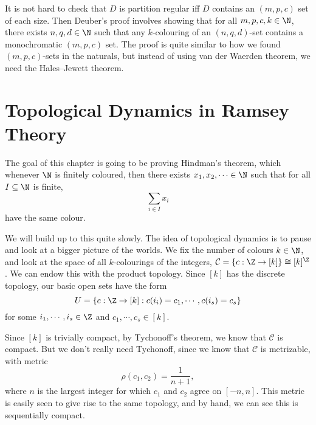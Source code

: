 \documentclass[a4paper]{article}
\begin{document}
It is not hard to check that $D$ is partition regular iff $D$ contains an $(m, p, c)$ set of each size. Then Deuber's proof involves showing that for all $m, p, c, k \in \N$, there exists $n, q, d \in \N $ such that any $k$-colouring of an $(n, q, d)$-set contains a monochromatic $(m, p, c)$ set. The proof is quite similar to how we found $(m, p, c)$-sets in the naturals, but instead of using van der Waerden theorem, we need the Hales--Jewett theorem.

\section{Topological Dynamics in Ramsey Theory}
The goal of this chapter is going to be proving Hindman's theorem, which whenever $\N$ is finitely coloured, then there exists $x_1, x_2, \cdots \in\N$ such that for all $I \subseteq \N$ is finite,
\[
  \sum_{i \in I} x_i
\]
have the same colour.

We will build up to this quite slowly. The idea of topological dynamics is to pause and look at a bigger picture of the worlds. We fix the number of colours $k \in \N$, and look at the space of all $k$-colourings of the integers, $\mathcal{C} = \{c: \Z \to [k]\} \cong [k]^{\Z}$. We can endow this with the product topology. Since $[k]$ has the discrete topology, our basic open sets have the form
\[
  U = \{c: \Z \to [k] : c(i_i) = c_1, \cdots, c(i_s) = c_s\}
\]
for some $i_1, \cdots, i_s \in \Z$ and $c_1, \cdots, c_s \in [k]$.

Since $[k]$ is trivially compact, by Tychonoff's theorem, we know that $\mathcal{C}$ is compact. But we don't really need Tychonoff, since we know that $\mathcal{C}$ is metrizable, with metric
\[
  \rho(c_1, c_2) = \frac{1}{n + 1},
\]
where $n$ is the largest integer for which $c_1$ and $c_2$ agree on $[-n, n]$. This metric is easily seen to give rise to the same topology, and by hand, we can see this is sequentially compact.
\end{document}
